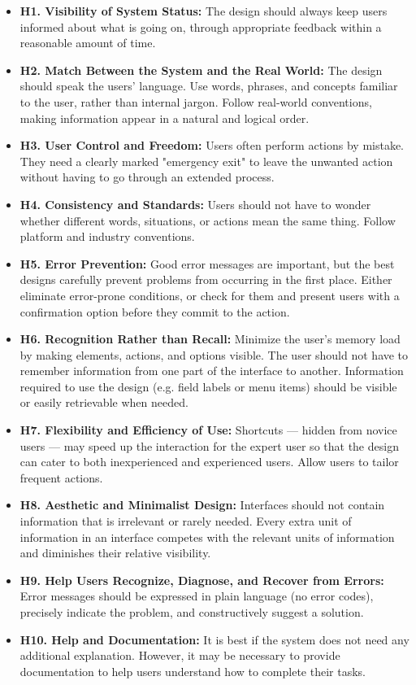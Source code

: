 \begin{itemize}
\item \textbf{H1. Visibility of System Status:} The design should always keep users informed about what is going on, through appropriate feedback within a reasonable amount of time.
\item \textbf{H2. Match Between the System and the Real World:} The design should speak the users' language. Use words, phrases, and concepts familiar to the user, rather than internal jargon. Follow real-world conventions, making information appear in a natural and logical order.
\item \textbf{H3. User Control and Freedom:} Users often perform actions by mistake. They need a clearly marked "emergency exit" to leave the unwanted action without having to go through an extended process.
\item \textbf{H4. Consistency and Standards:} Users should not have to wonder whether different words, situations, or actions mean the same thing. Follow platform and industry conventions.
\item \textbf{H5. Error Prevention:} Good error messages are important, but the best designs carefully prevent problems from occurring in the first place. Either eliminate error-prone conditions, or check for them and present users with a confirmation option before they commit to the action.
\item \textbf{H6. Recognition Rather than Recall:} Minimize the user's memory load by making elements, actions, and options visible. The user should not have to remember information from one part of the interface to another. Information required to use the design (e.g. field labels or menu items) should be visible or easily retrievable when needed.
\item \textbf{H7. Flexibility and Efficiency of Use:} Shortcuts — hidden from novice users — may speed up the interaction for the expert user so that the design can cater to both inexperienced and experienced users. Allow users to tailor frequent actions.
\item \textbf{H8. Aesthetic and Minimalist Design:} Interfaces should not contain information that is irrelevant or rarely needed. Every extra unit of information in an interface competes with the relevant units of information and diminishes their relative visibility.
\item \textbf{H9. Help Users Recognize, Diagnose, and Recover from Errors:} Error messages should be expressed in plain language (no error codes), precisely indicate the problem, and constructively suggest a solution.
\item \textbf{H10. Help and Documentation:} It is best if the system does not need any additional explanation. However, it may be necessary to provide documentation to help users understand how to complete their tasks.
\end{itemize}

